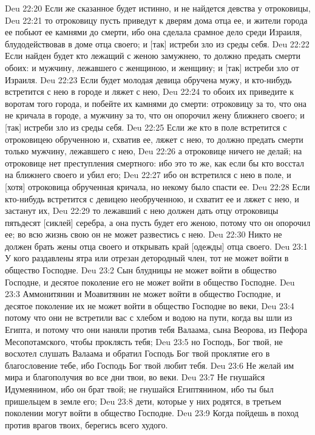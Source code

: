 Deu 22:20  Если же сказанное будет истинно, и не найдется девства у отроковицы,
Deu 22:21  то отроковицу пусть приведут к дверям дома отца ее, и жители города ее побьют ее камнями до смерти, ибо она сделала срамное дело среди Израиля, блудодействовав в доме отца своего; и [так] истреби зло из среды себя.
Deu 22:22  Если найден будет кто лежащий с женою замужнею, то должно предать смерти обоих: и мужчину, лежавшего с женщиною, и женщину; и [так] истреби зло от Израиля.
Deu 22:23  Если будет молодая девица обручена мужу, и кто-нибудь встретится с нею в городе и ляжет с нею,
Deu 22:24  то обоих их приведите к воротам того города, и побейте их камнями до смерти: отроковицу за то, что она не кричала в городе, а мужчину за то, что он опорочил жену ближнего своего; и [так] истреби зло из среды себя.
Deu 22:25  Если же кто в поле встретится с отроковицею обрученною и, схватив ее, ляжет с нею, то должно предать смерти только мужчину, лежавшего с нею,
Deu 22:26  а отроковице ничего не делай; на отроковице нет преступления смертного: ибо это то же, как если бы кто восстал на ближнего своего и убил его;
Deu 22:27  ибо он встретился с нею в поле, и [хотя] отроковица обрученная кричала, но некому было спасти ее.
Deu 22:28  Если кто-нибудь встретится с девицею необрученною, и схватит ее и ляжет с нею, и застанут их,
Deu 22:29  то лежавший с нею должен дать отцу отроковицы пятьдесят [сиклей] серебра, а она пусть будет его женою, потому что он опорочил ее; во всю жизнь свою он не может развестись с нею.
Deu 22:30  Никто не должен брать жены отца своего и открывать край [одежды] отца своего.
Deu 23:1  У кого раздавлены ятра или отрезан детородный член, тот не может войти в общество Господне.
Deu 23:2  Сын блудницы не может войти в общество Господне, и десятое поколение его не может войти в общество Господне.
Deu 23:3  Аммонитянин и Моавитянин не может войти в общество Господне, и десятое поколение их не может войти в общество Господне во веки,
Deu 23:4  потому что они не встретили вас с хлебом и водою на пути, когда вы шли из Египта, и потому что они наняли против тебя Валаама, сына Веорова, из Пефора Месопотамского, чтобы проклясть тебя;
Deu 23:5  но Господь, Бог твой, не восхотел слушать Валаама и обратил Господь Бог твой проклятие его в благословение тебе, ибо Господь Бог твой любит тебя.
Deu 23:6  Не желай им мира и благополучия во все дни твои, во веки.
Deu 23:7  Не гнушайся Идумеянином, ибо он брат твой; не гнушайся Египтянином, ибо ты был пришельцем в земле его;
Deu 23:8  дети, которые у них родятся, в третьем поколении могут войти в общество Господне.
Deu 23:9  Когда пойдешь в поход против врагов твоих, берегись всего худого.
